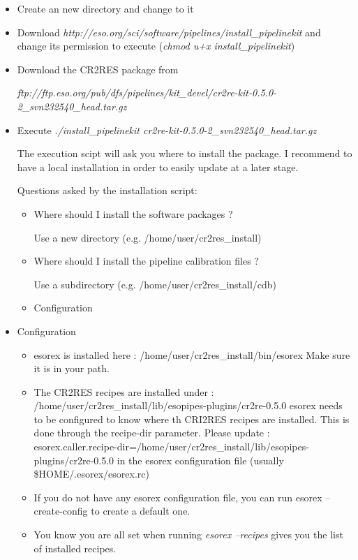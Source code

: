 \begin{itemize}
\item Create an new directory and change to it
\item Download {\it http://eso.org/sci/software/pipelines/install\_pipelinekit} and change its permission to execute ({\it chmod u+x install\_pipelinekit})
\item Download the CR2RES package from 

{\it ftp://ftp.eso.org/pub/dfs/pipelines/kit\_devel/cr2re-kit-0.5.0-2\_svn232540\_head.tar.gz}
\item Execute {\it ./install\_pipelinekit cr2re-kit-0.5.0-2\_svn232540\_head.tar.gz}

The execution scipt will ask you where to install the package. I recommend to have a local installation in order to easily update at a later stage.

Questions asked by the installation script:
\begin{itemize}

\item Where should I install the software packages ? 
      
Use a new directory (e.g. /home/user/cr2res\_install)

\item Where should I install the pipeline calibration files ?
     
Use a subdirectory (e.g. /home/user/cr2res\_install/cdb)

\item Configuration
\end{itemize}

\item Configuration

\begin{itemize}
\item esorex is installed here : /home/user/cr2res\_install/bin/esorex 
        Make sure it is in your path.

\item The CR2RES recipes are installed under : /home/user/cr2res\_install/lib/esopipes-plugins/cr2re-0.5.0
        esorex needs to be configured to know where th CRI2RES recipes are installed. This is done through the recipe-dir parameter.
        Please update :
        esorex.caller.recipe-dir=/home/user/cr2res\_install/lib/esopipes-plugins/cr2re-0.5.0
        in the esorex configuration file (usually \$HOME/.esorex/esorex.rc)

\item If you do not have any esorex configuration file, you can run
        esorex --create-config 
        to create a default one.

\item You know you are all set when running 
    {\it esorex --recipes}
        gives you the list of installed recipes.

\end{itemize}
\end{itemize}


